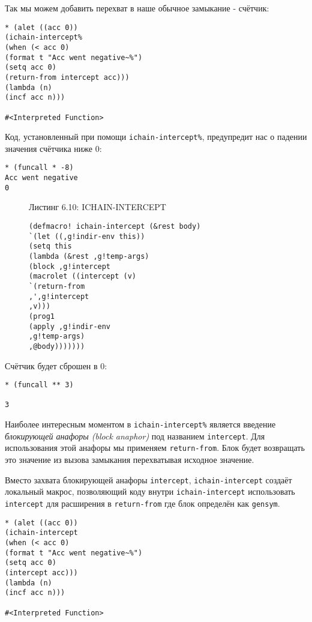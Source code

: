 Так мы можем добавить перехват в наше обычное замыкание - счётчик:

\begin{verbatim}
* (alet ((acc 0))
(ichain-intercept%
(when (< acc 0)
(format t "Acc went negative~%")
(setq acc 0)
(return-from intercept acc)))
(lambda (n)
(incf acc n)))

#<Interpreted Function>
\end{verbatim}

Код, установленный при помощи \verb"ichain-intercept%", предупредит нас о падении значения счётчика ниже 0:

\begin{verbatim}
* (funcall * -8)
Acc went negative
0
\end{verbatim}

\begin{figure}Листинг 6.10: ICHAIN-INTERCEPT\label{listing_6.10}
\listbegin
\begin{verbatim}
(defmacro! ichain-intercept (&rest body)
`(let ((,g!indir-env this))
(setq this
(lambda (&rest ,g!temp-args)
(block ,g!intercept
(macrolet ((intercept (v)
`(return-from
,',g!intercept
,v)))
(prog1
(apply ,g!indir-env
,g!temp-args)
,@body)))))))
\end{verbatim}
\listend
\end{figure}

Счётчик будет сброшен в 0:

\begin{verbatim}
* (funcall ** 3)

3
\end{verbatim}

Наиболее интересным моментом в \verb"ichain-intercept%" является введение \emph{блокирующей анафоры (block anaphor)} под названием \verb"intercept". Для использования этой анафоры мы применяем \verb"return-from". Блок будет возвращать это значение из вызова замыкания перехватывая исходное значение.

Вместо захвата блокирующей анафоры \verb"intercept", \verb"ichain-intercept" создаёт локальный макрос, позволяющий коду внутри \verb"ichain-intercept" использовать \verb"intercept" для расширения в \verb"return-from" где блок определён как \verb"gensym".

\begin{verbatim}
* (alet ((acc 0))
(ichain-intercept
(when (< acc 0)
(format t "Acc went negative~%")
(setq acc 0)
(intercept acc)))
(lambda (n)
(incf acc n)))

#<Interpreted Function>
\end{verbatim}

